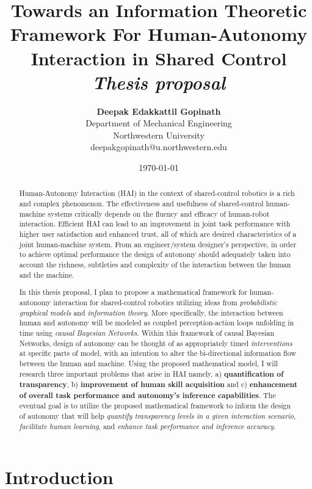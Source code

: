 \documentclass[12pt]{article}
\title{{\bf Towards an Information Theoretic Framework For Human-Autonomy Interaction in Shared Control} \\
\it Thesis proposal}
\author{ {\bf Deepak Edakkattil Gopinath}  \\
Department of Mechanical Engineering \\
Northwestern University\\
{\small deepakgopinath@u.northwestern.edu}
}
\date{\today}
\begin{document}
\pagestyle{plain}
\maketitle

\pagebreak
\begin{abstract}
Human-Autonomy Interaction (HAI) in the context of shared-control robotics is a rich and complex phenomenon. The effectiveness and usefulness of shared-control human-machine systems critically depends on the fluency and efficacy of human-robot interaction. Efficient HAI can lead to an improvement in joint task performance with higher user satisfaction and enhanced trust, all of which are desired characteristics of a joint human-machine system. From an engineer/system designer's perspective, in order to achieve optimal performance the design of autonomy should adequately taken into account the richness, subtleties and complexity of the interaction between the human and the machine.

In this thesis proposal, I plan to propose a mathematical framework for human-autonomy interaction for shared-control robotics utilizing ideas from \textit{probabilistic graphical models} and \textit{information theory}. More specifically, the interaction between human and autonomy will be modeled as coupled perception-action loops unfolding in time using \textit{causal Bayesian Networks}. Within this framework of causal Bayesian Networks, design of autonomy can be thought of as appropriately timed \textit{interventions} at specific parts of model, with an intention to alter the bi-directional information flow between the human and machine. Using the proposed mathematical model, I will research three important problems that arise in HAI namely, a) \textbf{quantification of transparency}, b) \textbf{improvement of human skill acquisition} and c) \textbf{enhancement	 of overall task performance and autonomy's inference capabilities}. The eventual goal is to utilize the proposed mathematical framework to inform the design of autonomy that will help \textit{quantify transparency levels in a given interaction scenario}, \textit{facilitate human learning}, and \textit{enhance task performance and inference accuracy}.
\end{abstract}

\pagebreak
\tableofcontents
\pagebreak

\cleardoublepage
{}

\section{Introduction}
\label{sec:intro}
\end{document}
